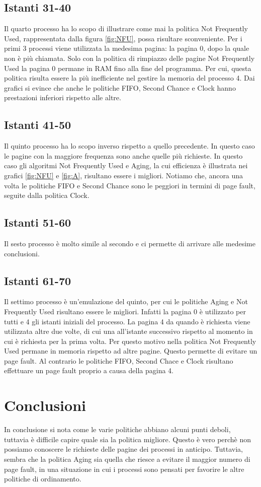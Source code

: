 \documentclass[12px]{article}
\begin{document}
\subsection{Istanti 31-40}
Il quarto processo ha lo scopo di illustrare come mai la politica Not Frequently Used, rappresentata dalla figura \ref{fig:NFU}, possa risultare sconveniente. Per i primi 3 processi viene utilizzata la medesima pagina: la pagina 0, dopo la quale non è più chiamata. Solo con la politica di rimpiazzo delle pagine Not Frequently Used la pagina 0 permane in RAM fino alla fine del programma. Per cui, questa politica risulta essere la più inefficiente nel gestire la memoria del processo 4. Dai grafici si evince che anche le politiche FIFO, Second Chance e Clock hanno prestazioni inferiori rispetto alle altre.

\subsection{Istanti 41-50}
Il quinto processo ha lo scopo inverso rispetto a quello precedente. In questo caso le pagine con la maggiore frequenza sono anche quelle più richieste. In questo caso gli algoritmi Not Frequently Used e Aging, la cui efficienza è illustrata nei grafici \ref{fig:NFU} e \ref{fig:A}, risultano essere i migliori. Notiamo che, ancora una volta le politiche FIFO e Second Chance sono le peggiori in termini di page fault, seguite dalla politica Clock.

\subsection{Istanti 51-60}
Il sesto processo è molto simile al secondo e ci permette di arrivare alle medesime conclusioni.

\subsection{Istanti 61-70}
Il settimo processo è un'emulazione del quinto, per cui le politiche Aging e Not Frequently Used risultano essere le migliori. Infatti la pagina 0 è utilizzato per tutti e 4 gli istanti iniziali del processo. La pagina 4 da quando è richiesta viene utilizzata altre due volte, di cui una all'istante successivo rispetto al momento in cui è richiesta per la prima volta. Per questo motivo nella politica Not Frequently Used permane in memoria rispetto ad altre pagine. Questo permette di evitare un page fault. Al contrario le politiche FIFO, Second Chace e Clock risultano effettuare un page fault proprio a causa della pagina 4.

\section{Conclusioni}
In conclusione si nota come le varie politiche abbiano alcuni punti deboli, tuttavia è difficile capire quale sia la politica migliore. Questo è vero perchè non possiamo conoscere le richieste delle pagine dei processi in anticipo. Tuttavia, sembra che la politica Aging sia quella che riesce a evitare il maggior numero di page fault, in una situazione in cui i processi sono pensati per favorire le altre politiche di ordinamento.
\end{document}
